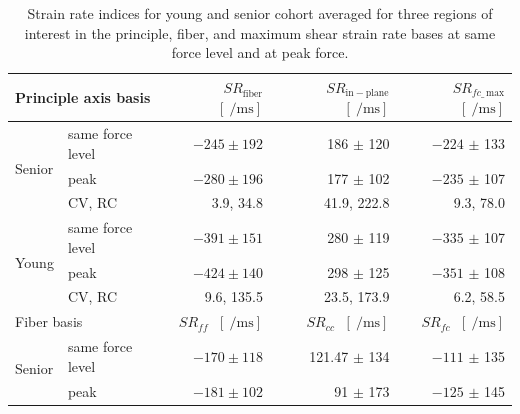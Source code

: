 \begin{table}[!htb]
\vspace{+0.2cm}
\caption[Strain rate indices for young and senior cohort at same force level and at peak force]{Strain rate indices for young and senior cohort averaged for three regions of interest in the principle, fiber, and maximum shear strain rate bases at same force level and at peak force.}
\label{tab: SR2_1}
\begin{center}
\begin{threeparttable}
\begin{tabular}{@{}llrrr@{}}
\toprule[1pt]\midrule[0.3pt]   
\multicolumn{2}{l}{Principle axis basis}	 	& $SR_\mathrm{fiber}$\tnote{$\dagger$} $\; \left[ \SI{}{\per\milli\second}\right]$ & $SR_\mathrm{in-plane}$\tnote{$\dagger$}   $\; \left[ \SI{}{\per\milli\second}\right]$ & $SR_{fc\_\,\mathrm{max}}$\tnote{$\dagger$}  $\; \left[ \SI{}{\per\milli\second}\right]$ \\ \midrule
\multicolumn{1}{l}{\multirow{3}{*}{Senior}} & same force level & $-245 \pm 192$  & 186 $\pm$ 120    & $-224$ $\pm$ 133  	\\
\multicolumn{1}{l}{}                        & peak             & $-280 \pm 196$  & 177 $\pm$ 102    & $-235$ $\pm$ 107  	\\
\multicolumn{1}{l}{}                        & CV, RC           & 3.9, 34.8   	 & 41.9, 222.8      & 9.3, 78.0  		\\ [6pt]
\multicolumn{1}{l}{\multirow{3}{*}{Young}}  & same force level & $-391 \pm 151$  & 280 $\pm$ 119    & $-335$ $\pm$ 107  	\\
\multicolumn{1}{l}{}                        & peak             & $-424 \pm 140$  & 298 $\pm$ 125    & $-351$ $\pm$ 108  	\\
\multicolumn{1}{l}{}                        & CV, RC           & 9.6, 135.5      & 23.5, 173.9      & 6.2, 58.5  		\\ \toprule[0.3pt]\midrule[0.3pt]
\multicolumn{2}{l}{Fiber basis}				& $SR_{ff}$   $\; \left[ \SI{}{\per\milli\second}\right]$     & $SR_{cc}$  $\; \left[ \SI{}{\per\milli\second}\right]$      & $SR_{fc}$  $\; \left[ \SI{}{\per\milli\second}\right]$      	\\ \midrule
\multicolumn{1}{l}{\multirow{2}{*}{Senior}}                     & same force level & $-170 \pm 118$  & 121.47 $\pm$ 134 & $-111$ $\pm$ 135  	\\
                                            & peak             & $-181 \pm 102$\tnote{$\dagger$} & 91 $\pm$ 173     & $-125$ $\pm$ 145  	\\ [6pt]

\end{tabular}
\end{threeparttable}
\end{center}
\end{table}
